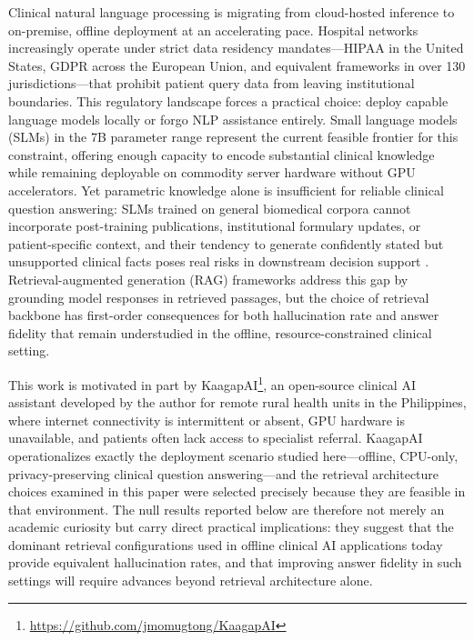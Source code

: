\documentclass{article}
\begin{document}
Clinical natural language processing is migrating from cloud-hosted inference to on-premise, offline deployment at an accelerating pace. Hospital networks increasingly operate under strict data residency mandates---HIPAA in the United States, GDPR across the European Union, and equivalent frameworks in over 130 jurisdictions---that prohibit patient query data from leaving institutional boundaries. This regulatory landscape forces a practical choice: deploy capable language models locally or forgo NLP assistance entirely. Small language models (SLMs) in the 7B parameter range represent the current feasible frontier for this constraint, offering enough capacity to encode substantial clinical knowledge while remaining deployable on commodity server hardware without GPU accelerators. Yet parametric knowledge alone is insufficient for reliable clinical question answering: SLMs trained on general biomedical corpora cannot incorporate post-training publications, institutional formulary updates, or patient-specific context, and their tendency to generate confidently stated but unsupported clinical facts poses real risks in downstream decision support \cite{singhal2023large}. Retrieval-augmented generation (RAG) frameworks address this gap by grounding model responses in retrieved passages, but the choice of retrieval backbone has first-order consequences for both hallucination rate and answer fidelity that remain understudied in the offline, resource-constrained clinical setting.

This work is motivated in part by KaagapAI\footnote{\url{https://github.com/jmomugtong/KaagapAI}}, an open-source clinical AI assistant developed by the author for remote rural health units in the Philippines, where internet connectivity is intermittent or absent, GPU hardware is unavailable, and patients often lack access to specialist referral. KaagapAI operationalizes exactly the deployment scenario studied here---offline, CPU-only, privacy-preserving clinical question answering---and the retrieval architecture choices examined in this paper were selected precisely because they are feasible in that environment. The null results reported below are therefore not merely an academic curiosity but carry direct practical implications: they suggest that the dominant retrieval configurations used in offline clinical AI applications today provide equivalent hallucination rates, and that improving answer fidelity in such settings will require advances beyond retrieval architecture alone.
\end{document}
